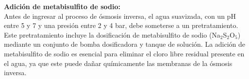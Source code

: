 \textbf{Adición de metabisulfito de sodio:}\\
Antes de ingresar al proceso de ósmosis inversa, el agua suavizada, con un pH entre 5 y 7 y una presión entre 2 y 4 bar, debe someterse a un pretratamiento.
Este pretratamiento incluye la dosificación de metabisulfito de sodio (Na$_2$S$_2$O$_5$) mediante un conjunto de bomba dosificadora y tanque de solución.
La adición de metabisulfito de sodio es esencial para eliminar el cloro libre residual presente en el agua,
ya que este puede dañar químicamente las membranas de la ósmosis inversa.

